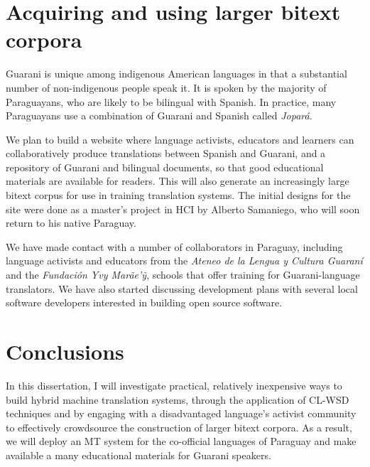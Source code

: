 \documentclass{article}
\begin{document}
\section{Acquiring and using larger bitext corpora}
Guarani is unique among indigenous American languages in that a substantial
number of non-indigenous people speak it. It is spoken by the majority of
Paraguayans, who are likely to be bilingual with Spanish. In practice, many
Paraguayans use a combination of Guarani and Spanish called \emph{Jopar{\'a}}.

We plan to build a website where language activists, educators and learners can
collaboratively produce translations between Spanish and Guarani, and a
repository of Guarani and bilingual documents, so that good educational
materials are available for readers. This will also generate an
increasingly large bitext corpus for use in training translation systems. The
initial designs for the site were done as a master's project in HCI by Alberto
Samaniego, who will soon return to his native Paraguay.

We have made contact with a number of collaborators in Paraguay, including
language activists and educators from the \emph{Ateneo de la Lengua y Cultura
Guaraní} and the \emph{Fundación Yvy Marãe'{\~y}}, schools that offer training
for Guarani-language translators. We have also started discussing development
plans with several local software developers interested in building open source
software.

\section{Conclusions}
In this dissertation, I will investigate practical, relatively inexpensive ways
to build hybrid machine translation systems, through the application of CL-WSD
techniques and by engaging with a disadvantaged language's activist community
to effectively crowdsource the construction of larger bitext corpora. As a
result, we will deploy an MT system for the co-official languages of Paraguay
and make available a many educational materials for Guarani speakers.
\end{document}

